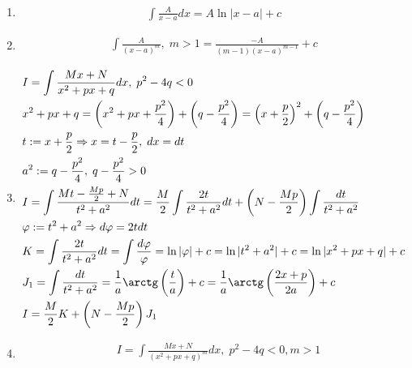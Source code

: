 \documentclass{article}
\begin{document}

\begin{enumerate}
	\item{}
	\begin{align*}
		\int \frac{A}{x-a}dx=A\ln|x-a|+c
	\end{align*}
	\item{}
	\begin{align*}
		\int \frac{A}{(x-a)^{m}},\;m>1=\frac{-A}{(m-1)(x-a)^{m-1}}+c
	\end{align*}
	\item{}
	\begin{align*}
		 & I=\int \frac{Mx+N}{x^{2}+px+q}dx,\;p^{2}-4q<0                                                                                                   \\
		 & x^{2}+px+q=\left(x^{2}+px+\frac{p^{2}}{4}\right)+\left(q-\frac{p^{2}}{4}\right)=\left(x+\frac{p}{2}\right)^{2}+\left(q-\frac{p^{2}}{4}\right)   \\
		 & t:=x+\frac{p}{2}\Rarr x=t-\frac{p}{2},\;dx=dt                                                                                                   \\
		 & a^{2}:=q-\frac{p^{2}}{4},\;q-\frac{p^{2}}{4}>0                                                                                                  \\
		 & I=\int \frac{Mt - \frac{Mp}{2}+N}{t^{2}+a^{2}}dt=\frac{M}{2}\int \frac{2t}{t^{2}+a^{2}}dt+\left(N-\frac{Mp}{2}\right)\int\frac{dt}{t^{2}+a^{2}} \\
		 & \varphi:=t^{2}+a^{2}\Rarr d\varphi=2tdt                                                                                                         \\
		 & K=\int \frac{2t}{t^{2}+a^{2}}dt=\int\frac{d\varphi}{\varphi}=\ln|\varphi|+c=\ln|t^{2}+a^{2}|+c=\ln|x^{2}+px+q|+c                                \\
		 & J_1=\int\frac{dt}{t^{2}+a^{2}}=\frac{1}{a}\arctg\left(\frac{t}{a}\right)+c=\frac{1}{a}\arctg\left(\frac{2x+p}{2a}\right)+c                      \\
		 & I=\frac{M}{2}K+\left(N-\frac{Mp}{2}\right)J_1
	\end{align*}
	\item{}
	\begin{align*}
		 & I=\int \frac{Mx+N}{(x^{2}+px+q)^{m}}dx,\;p^{2}-4q<0,m>1                                                                                                           \\

\end{align*}
\end{enumerate}
\end{document}
